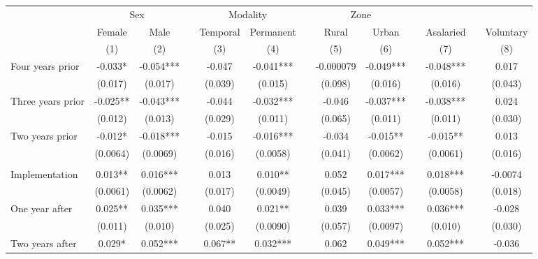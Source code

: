 \begin{tabular}{lcccccccccccc}
\toprule
      & \multicolumn{2}{c}{Sex} &       & \multicolumn{2}{c}{Modality} &       & \multicolumn{2}{c}{Zone} &       &       &       &  \\
\cmidrule{2-3}\cmidrule{5-6}\cmidrule{8-9}      & Female & Male  &       & Temporal & Permanent &       & Rural  & Urban &       & Asalaried &       & Voluntary \\
\midrule
      & (1)   & (2)   &       & (3)   & (4)   &       & (5)   & (6)   &       & (7)   &       & (8) \\
\midrule
\midrule
Four years prior & -0.033* & -0.054*** &       & -0.047 & -0.041*** &       & -0.000079 & -0.049*** &       & -0.048*** &       & 0.017 \\
      & (0.017) & (0.017) &       & (0.039) & (0.015) &       & (0.098) & (0.016) &       & (0.016) &       & (0.043) \\
Three years prior & -0.025** & -0.043*** &       & -0.044 & -0.032*** &       & -0.046 & -0.037*** &       & -0.038*** &       & 0.024 \\
      & (0.012) & (0.013) &       & (0.029) & (0.011) &       & (0.065) & (0.011) &       & (0.011) &       & (0.030) \\
Two years prior & -0.012* & -0.018*** &       & -0.015 & -0.016*** &       & -0.034 & -0.015** &       & -0.015** &       & 0.013 \\
      & (0.0064) & (0.0069) &       & (0.016) & (0.0058) &       & (0.041) & (0.0062) &       & (0.0061) &       & (0.016) \\
      &       &       &       &       &       &       &       &       &       &       &       &  \\
Implementation & 0.013** & 0.016*** &       & 0.013 & 0.010** &       & 0.052 & 0.017*** &       & 0.018*** &       & -0.0074 \\
      & (0.0061) & (0.0062) &       & (0.017) & (0.0049) &       & (0.045) & (0.0057) &       & (0.0058) &       & (0.018) \\
One year after & 0.025** & 0.035*** &       & 0.040 & 0.021** &       & 0.039 & 0.033*** &       & 0.036*** &       & -0.028 \\
      & (0.011) & (0.010) &       & (0.025) & (0.0090) &       & (0.057) & (0.0097) &       & (0.010) &       & (0.030) \\
Two years after & 0.029* & 0.052*** &       & 0.067** & 0.032*** &       & 0.062 & 0.049*** &       & 0.052*** &       & -0.036 \\

\end{tabular}
